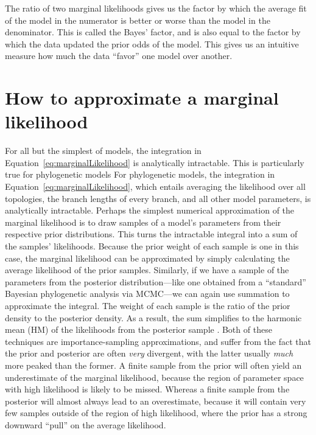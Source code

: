 The ratio of two marginal likelihoods gives us the factor by which the
average fit of the model in the numerator is better or worse than the
model in the denominator.
This is called the Bayes' factor, and is also equal to the factor by
which the data updated the prior odds of the model.
This gives us an intuitive measure how much the data ``favor'' one model over
another.

\section{How to approximate a marginal likelihood}

For all but the simplest of models, the integration in
Equation~\ref{eq:marginalLikelihood}
is analytically intractable.
This is particularly true for phylogenetic models
For phylogenetic models, the integration in
Equation~\ref{eq:marginalLikelihood}, which entails averaging the likelihood
over all topologies, the branch lengths of every branch, and all other model
parameters, is analytically intractable.
Perhaps the simplest numerical approximation of the marginal likelihood is to
draw samples of a model's parameters from their respective prior distributions.
This turns the intractable integral into a sum of the samples' likelihoods.
Because the prior weight of each sample is one in this case, the marginal
likelihood can be approximated by simply calculating the average likelihood of
the prior samples.
Similarly, if we have a sample of the parameters from the posterior
distribution---like one obtained from a ``standard'' Bayesian phylogenetic
analysis via MCMC---we can again use summation to approximate the integral.
The weight of each sample is the ratio of the prior density to the posterior
density.
As a result, the sum simplifies to the harmonic mean (HM) of the likelihoods
from the posterior sample \citep{Newton1994}.
Both of these techniques are importance-sampling approximations, and suffer
from the fact that the prior and posterior are often \emph{very} divergent,
with the latter usually \emph{much} more peaked than the former.
A finite sample from the prior will often yield an underestimate of the
marginal likelihood, because the region of parameter space with high likelihood
is likely to be missed.
Whereas a finite sample from the posterior will almost always lead to an
overestimate, because it will contain very few samples outside of the region of
high likelihood, where the prior has a strong downward ``pull'' on the average
likelihood.

